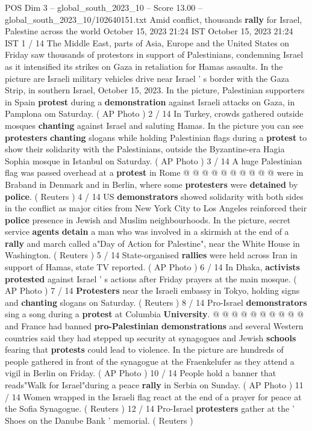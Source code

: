 \begin{textsample}{POS Dim 3 – global\_south\_2023\_10 – Score 13.00 – global\_south\_2023\_10/102640151.txt}  \label{ex:f3_pos_428}
Amid conflict, thousands \textbf{rally} for Israel, Palestine across the world October 15, 2023 21:24 IST October 15, 2023 21:24 IST 1 / 14 The Middle East, parts of Asia, Europe and the United States on Friday saw thousands of protestors in support of Palestinians, condemning Israel as it intensified its strikes on Gaza in retaliation for Hamas assaults.
In the picture are Israeli military vehicles drive near Israel ' s border with the Gaza Strip, in southern Israel, October 15, 2023.
In the picture, Palestinian supporters in Spain \textbf{protest} during a \textbf{demonstration} against Israeli attacks on Gaza, in Pamplona om Saturday. ( AP Photo ) 2 / 14 In Turkey, crowds gathered outside mosques \textbf{chanting} against Israel and saluting Hamas.
In the picture you can see \textbf{protesters} \textbf{chanting} slogans while holding Palestinian flags during a \textbf{protest} to show their solidarity with the Palestinians, outside the Byzantine-era Hagia Sophia mosque in Istanbul on Saturday. ( AP Photo ) 3 / 14 A huge Palestinian flag was passed overhead at a \textbf{protest} in Rome @ @ @ @ @ @ @ @ @ @ were in Braband in Denmark and in Berlin, where some \textbf{protesters} were \textbf{detained} by \textbf{police}. ( Reuters ) 4 / 14 US \textbf{demonstrators} showed solidarity with both sides in the conflict as major cities from New York City to Los Angeles reinforced their \textbf{police} presence in Jewish and Muslim neighbourhoods.
In the picture, secret service \textbf{agents} \textbf{detain} a man who was involved in a skirmish at the end of a \textbf{rally} and march called a"Day of Action for Palestine", near the White House in Washington. ( Reuters ) 5 / 14 State-organised \textbf{rallies} were held across Iran in support of Hamas, state TV reported. ( AP Photo ) 6 / 14 In Dhaka, \textbf{activists} \textbf{protested} against Israel ' s actions after Friday prayers at the main mosque. ( AP Photo ) 7 / 14 \textbf{Protesters} near the Israeli embassy in Tokyo, holding signs and \textbf{chanting} slogans on Saturday. ( Reuters ) 8 / 14 Pro-Israel \textbf{demonstrators} sing a song during a \textbf{protest} at Columbia \textbf{University}. @ @ @ @ @ @ @ @ @ @ and France had banned \textbf{pro-Palestinian} \textbf{demonstrations} and several Western countries said they had stepped up security at synagogues and Jewish \textbf{schools} fearing that \textbf{protests} could lead to violence.
In the picture are hundreds of people gathered in front of the synagogue at the Fraenkelufer as they attend a vigil in Berlin on Friday. ( AP Photo ) 10 / 14 People hold a banner that reads"Walk for Israel"during a peace \textbf{rally} in Serbia on Sunday. ( AP Photo ) 11 / 14 Women wrapped in the Israeli flag react at the end of a prayer for peace at the Sofia Synagogue. ( Reuters ) 12 / 14 Pro-Israel \textbf{protesters} gather at the ' Shoes on the Danube Bank ' memorial. ( Reuters )

\end{textsample}
